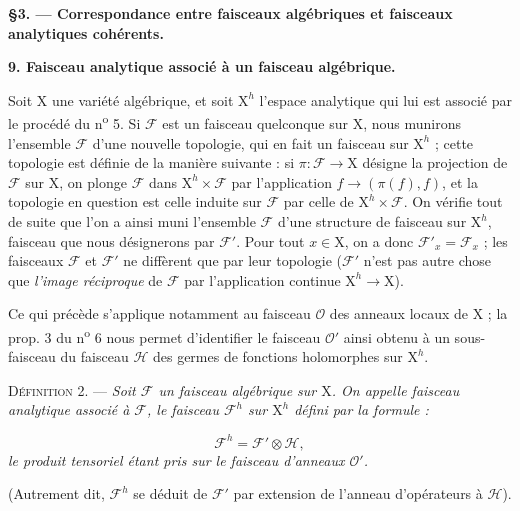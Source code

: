 

\begin{center}\bfseries \S 3. --- Correspondance entre faisceaux algébriques et faisceaux analytiques cohérents.\end{center}


\textbf{9. Faisceau analytique associé à un faisceau algébrique.}

Soit $\mathrm{X}$ une variété algébrique, et soit $\mathrm{X}^h$ l'espace analytique qui lui est associé par le procédé du n\textsuperscript{o} 5. Si $\mathcal{F}$ est un faisceau quelconque sur $\mathrm{X}$, nous munirons l'ensemble $\mathcal{F}$ d'une nouvelle topologie, qui en fait un faisceau sur $\mathrm{X}^h$ ; cette topologie est définie de la manière suivante : si $\pi : \mathcal{F} \to \mathrm{X}$ désigne la projection de $\mathcal{F}$ sur $\mathrm{X}$, on plonge $\mathcal{F}$ dans $\mathrm{X}^h \times \mathcal{F}$ par l'application $f \to (\pi(f), f)$, et la topologie en question est celle induite sur $\mathcal{F}$ par celle de $\mathrm{X}^h \times \mathcal{F}$. On vérifie tout de suite que l'on a ainsi muni l'ensemble $\mathcal{F}$ d'une structure de faisceau sur $\mathrm{X}^h$, faisceau que nous désignerons par $\mathcal{F}'$. Pour tout $x \in \mathrm{X}$, on a donc $\mathcal{F}'_x = \mathcal{F}_x$ ; les faisceaux $\mathcal{F}$ et $\mathcal{F}'$ ne diffèrent que par leur topologie ($\mathcal{F}'$ n'est pas autre chose que \emph{l'image réciproque} de $\mathcal{F}$ par l'application continue $\mathrm{X}^h \to \mathrm{X}$).

Ce qui précède s'applique notamment au faisceau $\mathcal{O}$ des anneaux locaux de $\mathrm{X}$ ; la prop. 3 du n\textsuperscript{o} 6 nous permet d'identifier le faisceau $\mathcal{O}'$ ainsi obtenu à un sous-faisceau du faisceau $\mathcal{H}$ des germes de fonctions holomorphes sur $\mathrm{X}^h$.

\textsc{Définition} 2. --- \emph{Soit $\mathcal{F}$ un faisceau algébrique sur $\mathrm{X}$. On appelle faisceau analytique associé à $\mathcal{F}$, le faisceau $\mathcal{F}^h$ sur $\mathrm{X}^h$ défini par la formule :}

\begin{equation*}
\mathcal{F}^h = \mathcal{F}' \otimes \mathcal{H},
\end{equation*}
\emph{le produit tensoriel étant pris sur le faisceau d'anneaux $\mathcal{O}'$.}

(Autrement dit, $\mathcal{F}^h$ se déduit de $\mathcal{F}'$ par extension de l'anneau d'opérateurs à $\mathcal{H}$).

